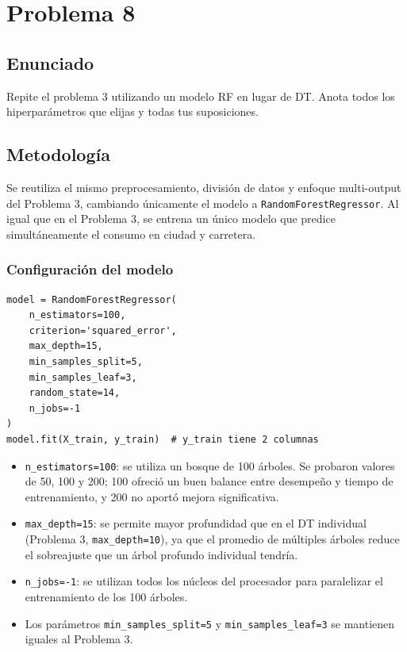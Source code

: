\documentclass{article}
\begin{document}
\section{Problema 8}

\subsection{Enunciado}

Repite el problema 3 utilizando un modelo RF en lugar de DT. Anota todos los hiperparámetros que elijas y todas tus suposiciones.

\subsection{Metodología}

Se reutiliza el mismo preprocesamiento, división de datos y enfoque multi-output del Problema 3, cambiando únicamente el modelo a \texttt{RandomForestRegressor}. Al igual que en el Problema 3, se entrena un único modelo que predice simultáneamente el consumo en ciudad y carretera.

\subsubsection{Configuración del modelo}

\begin{lstlisting}
model = RandomForestRegressor(
    n_estimators=100,
    criterion='squared_error',
    max_depth=15,
    min_samples_split=5,
    min_samples_leaf=3,
    random_state=14,
    n_jobs=-1
)
model.fit(X_train, y_train)  # y_train tiene 2 columnas
\end{lstlisting}

\begin{itemize}
    \item \texttt{n\_estimators=100}: se utiliza un bosque de 100 árboles. Se probaron valores de 50, 100 y 200; 100 ofreció un buen balance entre desempeño y tiempo de entrenamiento, y 200 no aportó mejora significativa.
    \item \texttt{max\_depth=15}: se permite mayor profundidad que en el DT individual (Problema 3, \texttt{max\_depth=10}), ya que el promedio de múltiples árboles reduce el sobreajuste que un árbol profundo individual tendría.
    \item \texttt{n\_jobs=-1}: se utilizan todos los núcleos del procesador para paralelizar el entrenamiento de los 100 árboles.
    \item Los parámetros \texttt{min\_samples\_split=5} y \texttt{min\_samples\_leaf=3} se mantienen iguales al Problema 3.
\end{itemize}
\end{document}
